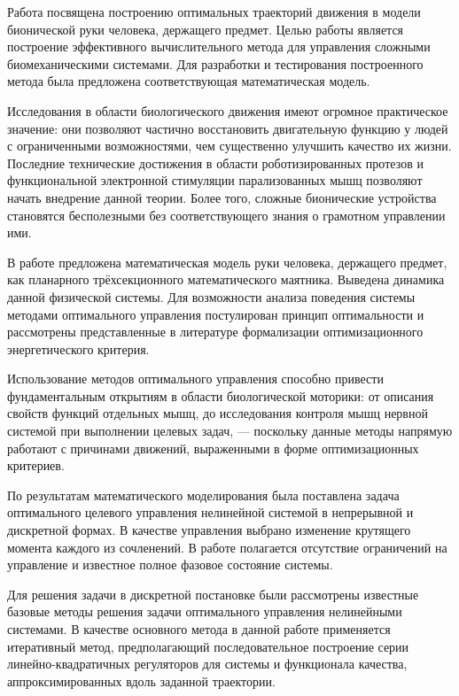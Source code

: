 \documentclass[../doc.tex]{subfiles}
\begin{document}
    Работа посвящена построению оптимальных траекторий движения в модели бионической руки человека,
        держащего предмет.
    Целью работы является построение эффективного вычислительного метода
        для управления сложными биомеханическими системами.
    Для разработки и тестирования построенного метода
        была предложена соответствующая математическая модель.
    
    Исследования в области биологического движения имеют огромное практическое значение:
        они позволяют частично восстановить двигательную фун\-кцию у людей
        с ограниченными возможностями,
        чем существенно улучшить качество их жизни.
    Последние технические достижения в области роботизированных протезов
        и функциональной электронной стимуляции парализованных мышц
        позволяют начать внедрение данной теории.
    Более того, сложные бионические устройства становятся бесполезными без соответствующего знания
        о грамотном управлении ими.

    В работе предложена математическая модель руки человека, держащего предмет,
        как планарного трёхсекционного математического маятника.
    Выведена динамика данной физической системы.
    Для возможности анализа поведения системы методами оптимального управления
        постулирован принцип оптимальности
        и рассмотрены представленные в литературе формализации
        оптимизационного энергетического критерия.
    
    Использование методов оптимального управления способно привести фундаментальным открытиям в области
        биологической моторики: от описания свойств функций отдельных мышц, до исследования контроля
        мышц нервной системой при выполнении целевых задач, ---
        поскольку данные методы напрямую работают с причинами движений, выраженными в форме оптимизационных критериев.

    По результатам математического моделирования была поставлена задача оптимального целевого управления нелинейной системой в непрерывной и дискретной формах.
    В качестве управления выбрано изменение крутящего момента каждого из сочленений.
    В работе полагается отсутствие ограничений на управление и известное полное фазовое состояние системы.

    Для решения задачи в дискретной постановке были рассмотрены известные базовые методы решения задачи
        оптимального управления нелинейными системами.
    В качестве основного метода в данной работе применяется итеративный метод,
        предполагающий последовательное построение серии линейно-квадратичных регуляторов
        для системы и функционала качества, аппроксимированных вдоль заданной траектории.
    
\end{document}
